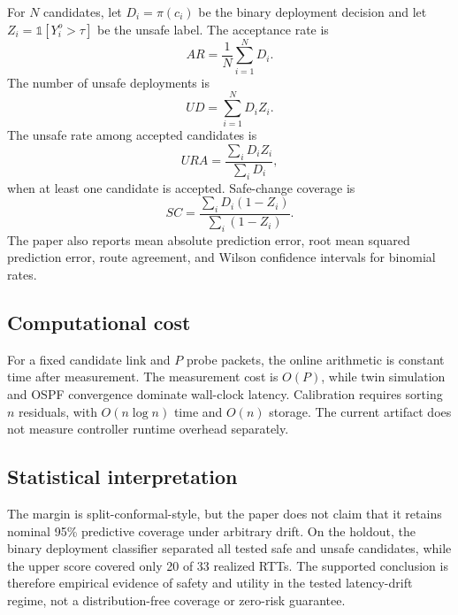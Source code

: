 For $N$ candidates, let $D_i=\pi(c_i)$ be the binary deployment decision and let $Z_i=\mathbb{1}[Y_i^o>\tau]$ be the unsafe label. The acceptance rate is
\[
AR=\frac{1}{N}\sum_{i=1}^{N}D_i.
\]
The number of unsafe deployments is
\[
UD=\sum_{i=1}^{N}D_iZ_i.
\]
The unsafe rate among accepted candidates is
\[
URA=\frac{\sum_i D_iZ_i}{\sum_i D_i},
\]
when at least one candidate is accepted. Safe-change coverage is
\[
SC=\frac{\sum_iD_i(1-Z_i)}{\sum_i(1-Z_i)}.
\]
The paper also reports mean absolute prediction error, root mean squared prediction error, route agreement, and Wilson confidence intervals for binomial rates.

\subsection{Computational cost}

For a fixed candidate link and $P$ probe packets, the online arithmetic is constant time after measurement. The measurement cost is $O(P)$, while twin simulation and OSPF convergence dominate wall-clock latency. Calibration requires sorting $n$ residuals, with $O(n\log n)$ time and $O(n)$ storage. The current artifact does not measure controller runtime overhead separately.

\subsection{Statistical interpretation}

The margin is split-conformal-style, but the paper does not claim that it retains nominal 95\% predictive coverage under arbitrary drift. On the holdout, the binary deployment classifier separated all tested safe and unsafe candidates, while the upper score covered only 20 of 33 realized RTTs. The supported conclusion is therefore empirical evidence of safety and utility in the tested latency-drift regime, not a distribution-free coverage or zero-risk guarantee.
